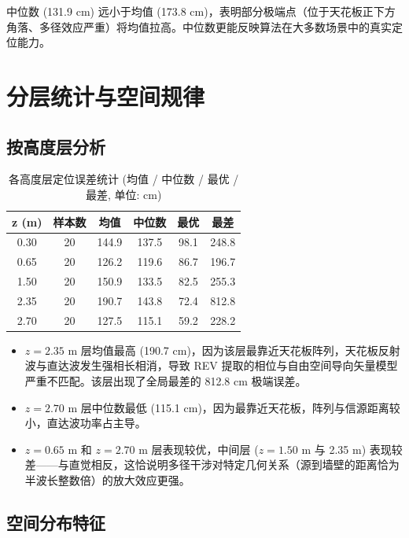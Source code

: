 \documentclass[12pt,a4paper]{ctexart}
\begin{document}
中位数 (131.9 cm) 远小于均值 (173.8 cm)，表明部分极端点（位于天花板正下方角落、多径效应严重）将均值拉高。中位数更能反映算法在大多数场景中的真实定位能力。

\section{分层统计与空间规律}

\subsection{按高度层分析}

\begin{table}[H]
\centering
\caption{各高度层定位误差统计 (均值 / 中位数 / 最优 / 最差, 单位: cm)}
\begin{tabular}{cccccc}
\toprule
\textbf{z (m)} & \textbf{样本数} & \textbf{均值} & \textbf{中位数} & \textbf{最优} & \textbf{最差} \\
\midrule
0.30 & 20 & 144.9 & 137.5 & 98.1  & 248.8 \\
0.65 & 20 & 126.2 & 119.6 & 86.7  & 196.7 \\
1.50 & 20 & 150.9 & 133.5 & 82.5  & 255.3 \\
2.35 & 20 & 190.7 & 143.8 & 72.4  & 812.8 \\
2.70 & 20 & 127.5 & 115.1 & 59.2  & 228.2 \\
\bottomrule
\end{tabular}
\end{table}

\begin{itemize}
    \item $z = 2.35$ m 层均值最高 (190.7 cm)，因为该层最靠近天花板阵列，天花板反射波与直达波发生强相长相消，导致 REV 提取的相位与自由空间导向矢量模型严重不匹配。该层出现了全局最差的 812.8 cm 极端误差。
    \item $z = 2.70$ m 层中位数最低 (115.1 cm)，因为最靠近天花板，阵列与信源距离较小，直达波功率占主导。
    \item $z = 0.65$ m 和 $z = 2.70$ m 层表现较优，中间层 ($z = 1.50$ m 与 2.35 m) 表现较差——与直觉相反，这恰说明多径干涉对特定几何关系（源到墙壁的距离恰为半波长整数倍）的放大效应更强。
\end{itemize}

\subsection{空间分布特征}
\end{document}
